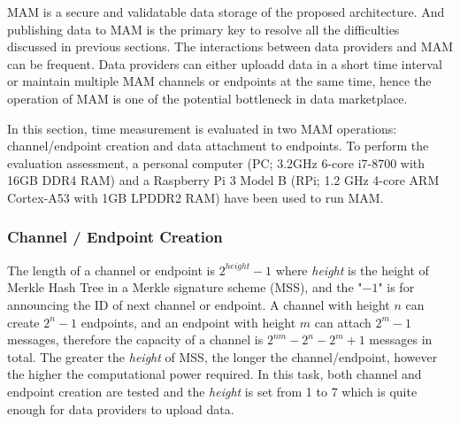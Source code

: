\documentclass[conference]{IEEEtran}
\begin{document}
MAM is a secure and validatable data storage of the proposed architecture. And publishing data to MAM is the primary key to resolve all the difficulties discussed in previous sections. The interactions between data providers and MAM can be frequent. Data providers can either uploadd data in a short time interval or maintain multiple MAM channels or endpoints at the same time, hence the operation of MAM is one of the potential bottleneck in data marketplace.

In this section, time measurement is evaluated in two MAM operations: channel/endpoint creation and data attachment to endpoints. To perform the evaluation assessment, a personal computer (PC; 3.2GHz 6-core i7-8700 with 16GB DDR4 RAM) and a Raspberry Pi 3 Model B (RPi; 1.2 GHz 4-core ARM Cortex-A53 with 1GB LPDDR2 RAM) have been used to run MAM.

\subsubsection{Channel / Endpoint Creation}
The length of a channel or endpoint is $2^{height}-1$ where \textit{height} is the height of Merkle Hash Tree in a Merkle signature scheme (MSS), and the "$-1$" is for announcing the ID of next channel or endpoint. A channel with height $n$ can create $2^n-1$ endpoints, and an endpoint with height $m$ can attach $2^m-1$ messages, therefore the capacity of a channel is $2^{nm}-2^n-2^m+1$ messages in total. The greater the \textit{height} of MSS, the longer the channel/endpoint, however the higher the computational power required. In this task, both channel and endpoint creation are tested and the \textit{height} is set from 1 to 7 which is quite enough for data providers to upload data.
\end{document}
